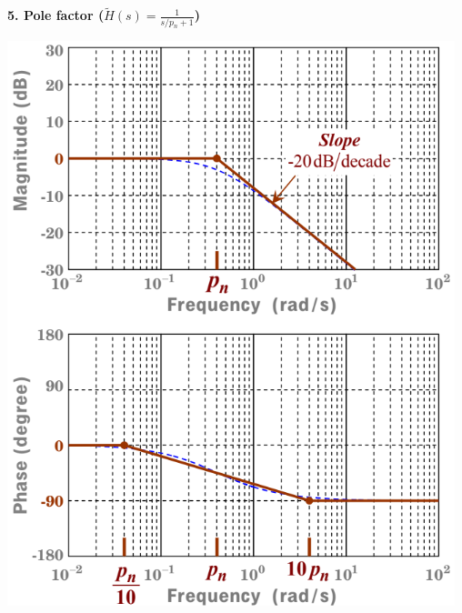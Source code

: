 \documentclass[landscape,a4paper]{extarticle}
\newenvironment{Figure}
  {\par\medskip\noindent\minipage{\linewidth}}
  {\endminipage\par\medskip}
\begin{document}
\begin{multicols*}{5}
    \textbf{5. Pole factor ($\tilde{H}(s) = \frac{1}{s/p_n + 1}$)}
    \begin{Figure}
        \centering
        \includegraphics[width=\linewidth]{bode_poleFactor.png}        
    \end{Figure}


\end{multicols*}
\end{document}
